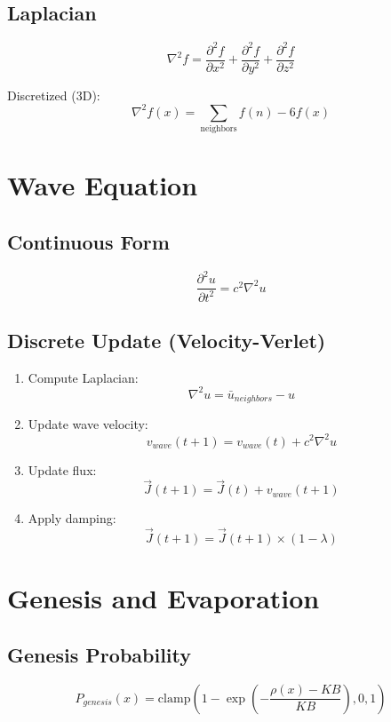 \documentclass[
  11pt,
  letterpaper,
  twoside,
  openany]{book}
\makeatletter
\let\orig@section\section
\renewcommand{\section}{\needspace{8\baselineskip}\orig@section}
\let\orig@subsection\subsection
\renewcommand{\subsection}{\needspace{6\baselineskip}\orig@subsection}
\makeatother
\begin{document}
\subsection{Laplacian}\label{laplacian}

\[
\nabla^2 f = \frac{\partial^2 f}{\partial x^2} + \frac{\partial^2 f}{\partial y^2} + \frac{\partial^2 f}{\partial z^2}
\]

Discretized (3D): \[
\nabla^2 f(x) = \sum_{\text{neighbors}} f(n) - 6f(x)
\]

\section{Wave Equation}\label{wave-equation}

\subsection{Continuous Form}\label{continuous-form}

\[
\frac{\partial^2 u}{\partial t^2} = c^2 \nabla^2 u
\]

\subsection{Discrete Update
(Velocity-Verlet)}\label{discrete-update-velocity-verlet}

\begin{enumerate}
\def\labelenumi{\arabic{enumi}.}
\item
  Compute Laplacian: \[
  \nabla^2 u = \bar{u}_{neighbors} - u
  \]
\item
  Update wave velocity: \[
  v_{wave}(t+1) = v_{wave}(t) + c^2 \nabla^2 u
  \]
\item
  Update flux: \[
  \vec{J}(t+1) = \vec{J}(t) + v_{wave}(t+1)
  \]
\item
  Apply damping: \[
  \vec{J}(t+1) = \vec{J}(t+1) \times (1 - \lambda)
  \]
\end{enumerate}

\section{Genesis and Evaporation}\label{genesis-and-evaporation}

\subsection{Genesis Probability}\label{genesis-probability}

\[
P_{genesis}(x) = \text{clamp}\left(1 - \exp\left(-\frac{\rho(x) - KB}{KB}\right), 0, 1\right)
\]
\end{document}
